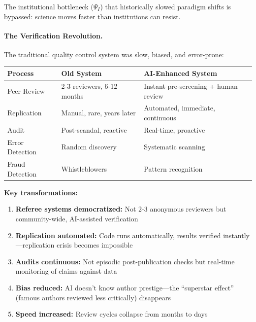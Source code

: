The institutional bottleneck ($\Psi_I$) that historically slowed paradigm shifts
is bypassed: science moves faster than institutions can resist.

\paragraph{The Verification Revolution.}

The traditional quality control system was slow, biased, and error-prone:

\begin{center}
\renewcommand{\arraystretch}{1.3}
\small
\begin{tabular}{@{}lll@{}}
\toprule
\textbf{Process} & \textbf{Old System} & \textbf{AI-Enhanced System} \\
\midrule
Peer Review & 2-3 reviewers, 6-12 months & Instant pre-screening + human review \\
Replication & Manual, rare, years later & Automated, immediate, continuous \\
Audit & Post-scandal, reactive & Real-time, proactive \\
Error Detection & Random discovery & Systematic scanning \\
Fraud Detection & Whistleblowers & Pattern recognition \\
\bottomrule
\end{tabular}
\end{center}

\textbf{Key transformations:}

\begin{enumerate}[nosep]
    \item \textbf{Referee systems democratized:} Not 2-3 anonymous reviewers but
        community-wide, AI-assisted verification
    \item \textbf{Replication automated:} Code runs automatically, results verified
        instantly---replication crisis becomes impossible
    \item \textbf{Audits continuous:} Not episodic post-publication checks but
        real-time monitoring of claims against data
    \item \textbf{Bias reduced:} AI doesn't know author prestige---the ``superstar effect''
        (famous authors reviewed less critically) disappears
    \item \textbf{Speed increased:} Review cycles collapse from months to days
\end{enumerate}

